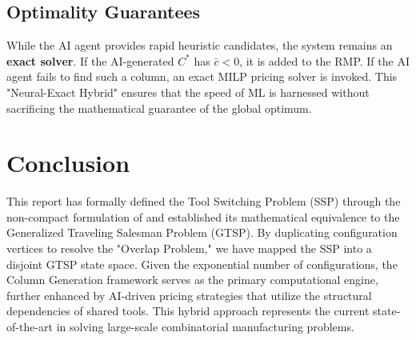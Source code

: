 \documentclass[12pt]{article}
\begin{document}
\subsection{Optimality Guarantees}
While the AI agent provides rapid heuristic candidates, the system remains an \textbf{exact solver}. If the AI-generated $C^*$ has $\bar{c} < 0$, it is added to the RMP. If the AI agent fails to find such a column, an exact MILP pricing solver is invoked. This "Neural-Exact Hybrid" ensures that the speed of ML is harnessed without sacrificing the mathematical guarantee of the global optimum.

\section{Conclusion}
This report has formally defined the Tool Switching Problem (SSP) through the non-compact formulation of \textcite{Colares2026} and established its mathematical equivalence to the Generalized Traveling Salesman Problem (GTSP). By duplicating configuration vertices to resolve the "Overlap Problem," we have mapped the SSP into a disjoint GTSP state space. Given the exponential number of configurations, the Column Generation framework serves as the primary computational engine, further enhanced by AI-driven pricing strategies that utilize the structural dependencies of shared tools. This hybrid approach represents the current state-of-the-art in solving large-scale combinatorial manufacturing problems.

\newpage
\printbibliography
\end{document}
